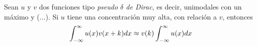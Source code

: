 
\begin{proposicion}
Sean $u$ y $v$ dos funciones tipo \textit{pseudo $\delta$ de Dirac}, es decir, unimodales con un
máximo  y (...). Si $u$ tiene una concentración muy alta, con relación a $v$, entonces
\begin{equation*}
\int_{-\infty}^{\infty} u(x) v(x+k) dx \approx v(k) \int_{-\infty}^{\infty} u(x) dx
\end{equation*}
\label{pseudo_d}
\end{proposicion}


